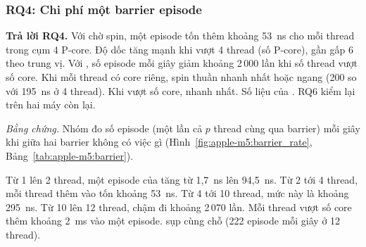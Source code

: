 \subsubsection{RQ4: Chi phí một barrier episode}

\begin{rqanswer}\textbf{Trả lời RQ4.} Với chờ spin, một episode tốn thêm khoảng 53~ns cho mỗi thread
trong cụm 4 P-core. Độ dốc tăng mạnh khi vượt 4 thread (số P-core), gần gấp 6 theo trung vị. Với , số episode
mỗi giây giảm khoảng 2\,000 lần khi số thread vượt số core. Khi mỗi thread có core riêng, spin thuần
nhanh nhất hoặc ngang  (200 so với 195~ns ở 4 thread). Khi vượt số core,
 nhanh nhất. Số liệu của . RQ6 kiểm lại trên hai máy còn
lại.\end{rqanswer}

\emph{Bằng chứng.} Nhóm đo số episode (một lần cả $p$ thread cùng qua barrier) mỗi giây khi giữa hai
barrier không có việc gì (Hình~\ref{fig:apple-m5:barrier_rate}, Bảng~\ref{tab:apple-m5:barrier}).


Từ 1 lên 2 thread, một episode của  tăng từ 1,7~ns lên 94,5~ns. Từ 2 tới 4 thread, mỗi
thread thêm vào tốn khoảng 53~ns. Từ 4 tới 10 thread, mức này là khoảng 295~ns. Từ 10 lên 12 thread,
 chậm đi khoảng 2\,070 lần. Mỗi thread vượt số core thêm khoảng 2~ms vào một episode.
 sụp cùng chỗ (222 episode mỗi giây ở 12 thread).

